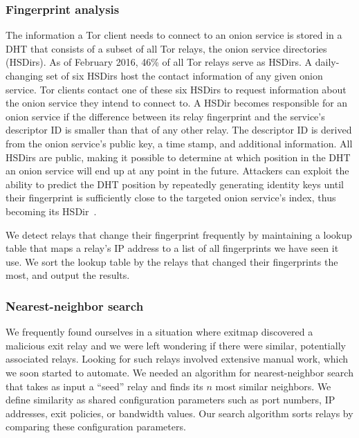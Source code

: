 \subsubsection{Fingerprint analysis}
\label{sec:fingerprint-analysis}
The information a Tor client needs to connect to an onion service is stored in a
DHT that consists of a subset of all Tor relays, the onion service directories
(HSDirs).  As of February 2016, 46\% of all Tor relays serve as HSDirs.  A
daily-changing set of six HSDirs host the contact information of any given
onion service.  Tor clients contact one of these six HSDirs to request
information about the onion service they intend to connect to.  A HSDir becomes
responsible for an onion service if the difference between its relay fingerprint
and the service's descriptor ID is smaller than that of any other relay.  The
descriptor ID is derived from the onion service's public key, a time stamp, and
additional information.
All HSDirs are public, making it possible to determine at which position in the
DHT an onion service will end up at any point in the future.  Attackers can
exploit the ability to predict the DHT position by repeatedly generating
identity keys until their fingerprint is sufficiently close to the targeted
onion service's index, thus becoming its HSDir~\cite{Biryukov2013a}.

We detect relays that change their fingerprint frequently by maintaining a
lookup table that maps a relay's IP address to a list of all fingerprints we
have seen it use.  We sort the lookup table by the relays that changed their
fingerprints the most, and output the results.

\subsubsection{Nearest-neighbor search}
\label{sec:nearest-neighbor}
We frequently found ourselves in a situation where exitmap discovered a
malicious exit relay and we were left wondering if there were similar,
potentially associated relays.  Looking for such relays involved extensive
manual work, which we soon started to automate.  We needed an algorithm for
nearest-neighbor search that takes as input a ``seed'' relay and finds its $n$
most similar neighbors.  We define similarity as shared configuration parameters
such as port numbers, IP addresses, exit policies, or bandwidth values.  Our
search algorithm sorts relays by comparing these configuration parameters.

